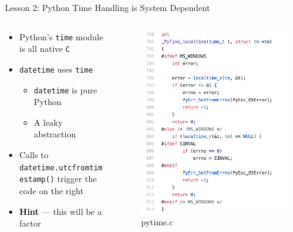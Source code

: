 \documentclass[10pt]{beamer}
\begin{document}
\begin{frame}{Lesson 2: Python Time Handling is System Dependent}
	\begin{columns}
		\begin{column}{0.5 \textwidth}
			\begin{itemize}
				\item Python's \texttt{time} module is all native \texttt{C}
				\item \texttt{datetime} uses \texttt{time}
					\begin{itemize}
						\item \texttt{datetime} is pure Python
						\item A leaky abstraction
					\end{itemize}
				\item Calls to \texttt{datetime.utcfromtimestamp()} trigger the code on the right
				\item \textbf{Hint} --- this will be a factor
			\end{itemize}
		\end{column}
		\begin{column}{0.5 \textwidth}
			\begin{figure}
				\includegraphics[width=0.9\columnwidth]{images/rabbithole.png}
				\caption{pytime.c}
			\end{figure}
		\end{column}
	\end{columns}
\end{frame}
\end{document}
